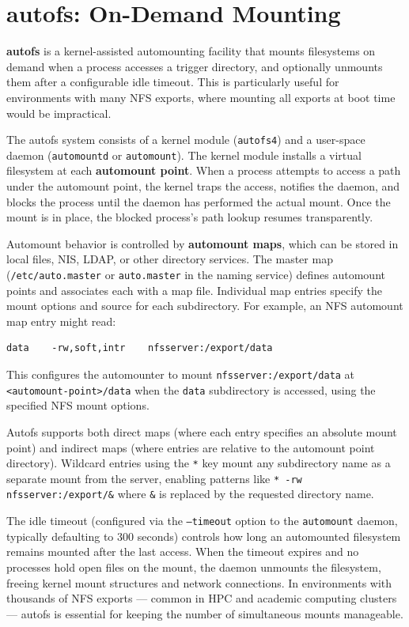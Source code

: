 \section{autofs: On-Demand Mounting}

\textbf{autofs} is a kernel-assisted automounting facility that mounts filesystems on demand when a process accesses a trigger directory, and optionally unmounts them after a configurable idle timeout. This is particularly useful for environments with many NFS exports, where mounting all exports at boot time would be impractical.

The autofs system consists of a kernel module (\texttt{autofs4}) and a user-space daemon (\texttt{automountd} or \texttt{automount}). The kernel module installs a virtual filesystem at each \textbf{automount point}. When a process attempts to access a path under the automount point, the kernel traps the access, notifies the daemon, and blocks the process until the daemon has performed the actual mount. Once the mount is in place, the blocked process's path lookup resumes transparently.

Automount behavior is controlled by \textbf{automount maps}, which can be stored in local files, NIS, LDAP, or other directory services. The master map (\texttt{/etc/auto.master} or \texttt{auto.master} in the naming service) defines automount points and associates each with a map file. Individual map entries specify the mount options and source for each subdirectory. For example, an NFS automount map entry might read:

\begin{verbatim}
data    -rw,soft,intr    nfsserver:/export/data
\end{verbatim}

This configures the automounter to mount \texttt{nfsserver:/export/data} at \texttt{<automount-point>/data} when the \texttt{data} subdirectory is accessed, using the specified NFS mount options.

Autofs supports both direct maps (where each entry specifies an absolute mount point) and indirect maps (where entries are relative to the automount point directory). Wildcard entries using the \texttt{*} key mount any subdirectory name as a separate mount from the server, enabling patterns like \texttt{*  -rw  nfsserver:/export/\&} where \texttt{\&} is replaced by the requested directory name.

The idle timeout (configured via the \texttt{--timeout} option to the \texttt{automount} daemon, typically defaulting to 300 seconds) controls how long an automounted filesystem remains mounted after the last access. When the timeout expires and no processes hold open files on the mount, the daemon unmounts the filesystem, freeing kernel mount structures and network connections. In environments with thousands of NFS exports --- common in HPC and academic computing clusters --- autofs is essential for keeping the number of simultaneous mounts manageable.

